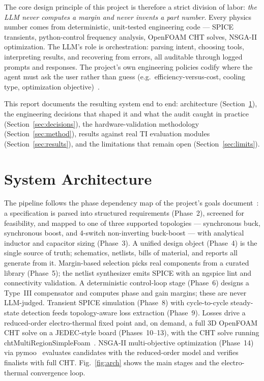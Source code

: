\documentclass[conference]{IEEEtran}
\newcommand{\eg}{e.g.}
\begin{document}
The core design principle of this project is therefore a strict division
of labor: \emph{the LLM never computes a margin and never invents a part
number}. Every physics number comes from deterministic, unit-tested
engineering code --- SPICE transients, python-control frequency analysis,
OpenFOAM CHT solves, NSGA-II optimization. The LLM's role is
orchestration: parsing intent, choosing tools, interpreting results,
and recovering from errors, all auditable through logged prompts and
responses. The project's own engineering policies codify where the agent
must ask the user rather than guess (\eg\ efficiency-versus-cost,
cooling type, optimization objective)~\cite{goals}.

This report documents the resulting system end to end: architecture
(Section~\ref{sec:arch}), the engineering decisions that shaped it and
what the audit caught in practice (Section~\ref{sec:decisions}), the
hardware-validation methodology (Section~\ref{sec:method}), results
against real TI evaluation modules (Section~\ref{sec:results}), and the
limitations that remain open (Section~\ref{sec:limits}).

\section{System Architecture}
\label{sec:arch}

The pipeline follows the phase dependency map of the project's goals
document~\cite{goals}: a specification is parsed into structured
requirements (Phase~2), screened for feasibility, and mapped to one of
three supported topologies --- synchronous buck, synchronous boost, and
4-switch non-inverting buck-boost --- with analytical inductor and
capacitor sizing (Phase~3). A unified design object (Phase~4) is the
single source of truth; schematics, netlists, bills of material, and
reports all generate from it. Margin-based selection picks real
components from a curated library (Phase~5); the netlist synthesizer
emits SPICE with an ngspice lint and connectivity validation. A
deterministic control-loop stage (Phase~6) designs a Type~III
compensator and computes phase and gain margins; these are never
LLM-judged. Transient SPICE simulation (Phase~8) with cycle-to-cycle
steady-state detection feeds topology-aware loss extraction
(Phase~9). Losses drive a reduced-order electro-thermal fixed point and,
on demand, a full 3D OpenFOAM CHT solve on a JEDEC-style board
(Phases~10--13), with the CHT solve running
chtMultiRegionSimpleFoam~\cite{openfoam}. NSGA-II multi-objective
optimization (Phase~14) via pymoo~\cite{pymoo} evaluates candidates with
the reduced-order model and verifies finalists with full CHT.
Fig.~\ref{fig:arch} shows the main stages and the electro-thermal
convergence loop.
\end{document}
